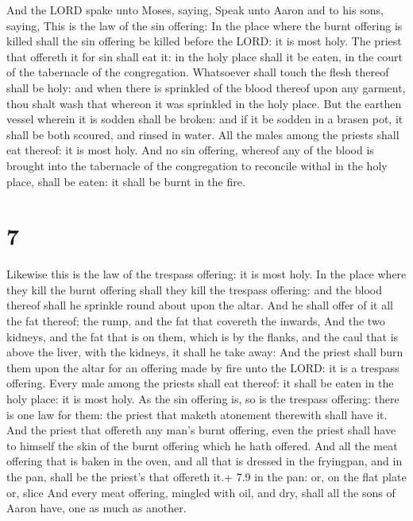  And the LORD spake unto Moses, saying, 
Speak unto Aaron and to his sons, saying, This is the law of the sin
offering: In the place where the burnt offering is killed shall the sin
offering be killed before the LORD: it is most holy.  The
priest that offereth it for sin shall eat it: in the holy place shall it
be eaten, in the court of the tabernacle of the congregation.
 Whatsoever shall touch the flesh thereof shall be holy:
and when there is sprinkled of the blood thereof upon any garment, thou
shalt wash that whereon it was sprinkled in the holy place.
 But the earthen vessel wherein it is sodden shall be
broken: and if it be sodden in a brasen pot, it shall be both scoured,
and rinsed in water.  All the males among the priests shall
eat thereof: it is most holy.  And no sin offering, whereof
any of the blood is brought into the tabernacle of the congregation to
reconcile withal in the holy place, shall be eaten: it shall be burnt in
the fire.

\hypertarget{section-6}{%
\section{7}\label{section-6}}

 Likewise this is the law of the trespass offering: it is
most holy.  In the place where they kill the burnt offering
shall they kill the trespass offering: and the blood thereof shall he
sprinkle round about upon the altar.  And he shall offer of
it all the fat thereof; the rump, and the fat that covereth the inwards,
 And the two kidneys, and the fat that is on them, which is
by the flanks, and the caul that is above the liver, with the kidneys,
it shall he take away:  And the priest shall burn them upon
the altar for an offering made by fire unto the LORD: it is a trespass
offering.  Every male among the priests shall eat thereof:
it shall be eaten in the holy place: it is most holy.  As
the sin offering is, so is the trespass offering: there is one law for
them: the priest that maketh atonement therewith shall have it.
 And the priest that offereth any man's burnt offering, even
the priest shall have to himself the skin of the burnt offering which he
hath offered.  And all the meat offering that is baken in
the oven, and all that is dressed in the fryingpan, and in the pan,
shall be the priest's that offereth it.+ 7.9 in the pan: or, on the flat
plate or, slice  And every meat offering, mingled with oil,
and dry, shall all the sons of Aaron have, one as much as another.

